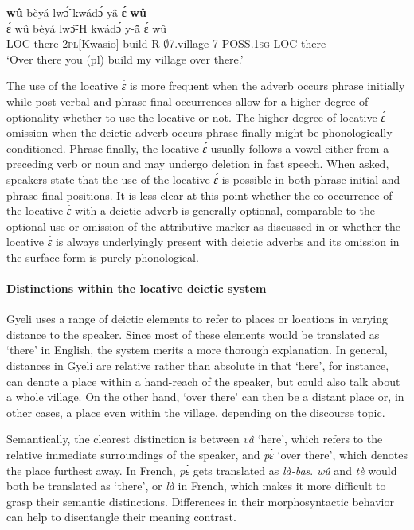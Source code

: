 \begin{exe} 
\ex\label{ADV1bothb}
   {\bfseries wû} bèyá lwɔ̃́ kwádɔ́ yã̂ {\bfseries ɛ́} {\bfseries wû}  \\
         ɛ́ wû bèyá lwɔ̃̂-H kwádɔ́ y-ã̂ ɛ́ wû  \\
         LOC there 2\textsc{pl}[Kwasio] build-R $\emptyset$7.village 7-POSS.1\textsc{sg} LOC there\\
    \trans `Over there you (pl) build my village over there.'
\end{exe}


The use of the locative {\itshape ɛ́} is more frequent when the adverb occurs phrase initially while post-verbal and  phrase final occurrences allow for a higher degree of optionality whether to use the locative or not. 
The higher degree of locative {\itshape ɛ́} omission when the deictic adverb occurs phrase finally might be phonologically conditioned. Phrase finally, the locative {\itshape ɛ́} usually follows a vowel either from a preceding verb or noun and may undergo deletion in fast speech. When asked, speakers state that the use of the locative {\itshape ɛ́} is possible in both phrase initial and phrase final positions. It is less clear at this point whether the co-occurrence of the locative {\itshape ɛ́} with a deictic adverb is generally optional, comparable to the optional use or omission of the attributive marker as discussed in  or whether the locative {\itshape ɛ́} is always underlyingly present with deictic adverbs and its omission in the surface form is purely phonological. 



\paragraph{Distinctions within the locative deictic system} 
Gyeli uses a range of deictic elements to refer to places or locations in varying distance to the speaker. Since most of these elements would be translated as `there' in English, the system merits a more thorough explanation. In general, distances in Gyeli are relative rather than absolute in that `here', for instance,  can denote a place within a hand-reach of the speaker, but could also talk about a whole village. On the other hand, `over there' can then be a distant place or, in other cases,  a place even within  the village, depending on the discourse topic. 

Semantically, the clearest distinction is between {\itshape vâ} `here', which refers to the relative immediate surroundings of the speaker, and {\itshape pɛ̀} `over there', which denotes the place furthest away. In French, {\itshape pɛ̀} gets translated as {\itshape là-bas}. {\itshape wû} and {\itshape tè} would both be translated as `there', or {\itshape là} in French, which makes it more difficult to grasp their semantic distinctions. Differences in their morphosyntactic behavior can help to disentangle their meaning contrast.


